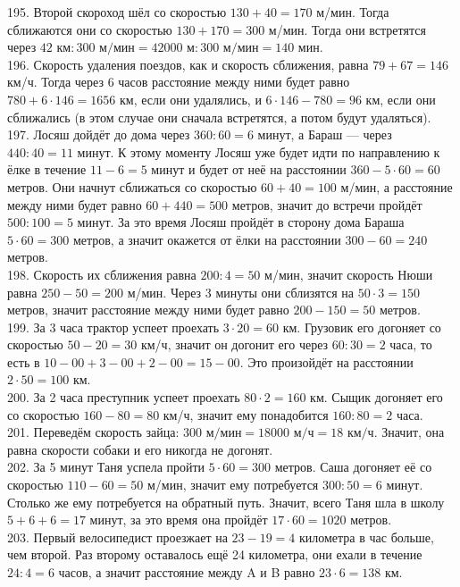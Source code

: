 195. Второй скороход шёл со скоростью $130+40=170$ м/мин. Тогда сближаются они со скоростью $130+170=300$ м/мин. Тогда они встретятся через $42\text{ км}:300\text{ м/мин}=42000\text{ м}:300\text{ м/мин}=140\text{ мин.}$\\
196. Скорость удаления поездов, как и скорость сближения, равна $79+67=146$ км/ч. Тогда через 6 часов расстояние между ними будет равно $780+6\cdot146=1656$ км, если они удалялись, и $6\cdot146-780=96$ км, если они сближались (в этом случае они сначала встретятся, а потом будут удаляться).\\
197. Лосяш дойдёт до дома через $360:60=6$ минут, а Бараш --- через $440:40=11$ минут. К этому моменту Лосяш уже будет идти по направлению к ёлке в течение $11-6=5$ минут и будет от неё на расстоянии $360-5\cdot60=60$ метров. Они начнут сближаться со скоростью $60+40=100$ м/мин, а расстояние между ними будет равно $60+440=500$ метров, значит до встречи пройдёт $500:100=5$ минут. За это время Лосяш пройдёт в сторону дома Бараша $5\cdot60=300$ метров, а значит окажется от ёлки на расстоянии $300-60=240$ метров.\\
198. Скорость их сближения равна $200:4=50$ м/мин, значит скорость Нюши равна $250-50=200$ м/мин. Через 3 минуты они сблизятся на $50\cdot3=150$ метров, значит расстояние между ними будет равно $200-150=50$ метров.\\
199. За 3 часа трактор успеет проехать $3\cdot20=60$ км. Грузовик его догоняет со скоростью $50-20=30$ км/ч, значит он догонит его через $60:30=2$ часа, то есть в $10-00+3-00+2-00=15-00.$ Это произойдёт на расстоянии $2\cdot50=100$ км.\\
200. За 2 часа преступник успеет проехать $80\cdot2=160$ км. Сыщик догоняет его со скоростью $160-80=80$ км/ч, значит ему понадобится $160:80=2$ часа.\\
201. Переведём скорость зайца: $300\text{ м/мин}=18000\text{ м/ч}=18\text{ км/ч.}$ Значит, она равна скорости собаки и его никогда не догонят.\\
202. За 5 минут Таня успела пройти $5\cdot60=300$ метров. Саша догоняет её со скоростью $110-60=50$ м/мин, значит ему потребуется $300:50=6$ минут. Столько же ему потребуется на обратный путь. Значит, всего Таня шла в школу $5+6+6=17$ минут, за это время она пройдёт $17\cdot60=1020$ метров.\\
203. Первый велосипедист проезжает на $23-19=4$ километра в час больше, чем второй. Раз второму оставалось ещё 24 километра, они ехали в течение $24:4=6$ часов, а значит расстояние между A и B равно $23\cdot6=138$ км.\\
